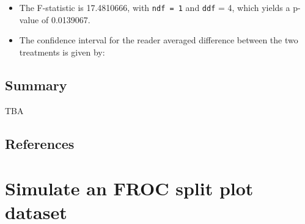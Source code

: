 \documentclass[]{book}
\newenvironment{Shaded}{\begin{snugshade}}{\end{snugshade}}
\newcommand{\CommentTok}[1]{\textcolor[rgb]{0.56,0.35,0.01}{\textit{#1}}}
\newcommand{\NormalTok}[1]{#1}
\newcommand{\OperatorTok}[1]{\textcolor[rgb]{0.81,0.36,0.00}{\textbf{#1}}}
\begin{document}
\begin{Shaded}
\end{Shaded}

\begin{itemize}
\item
  The F-statistic is 17.4810666, with \texttt{ndf\ =\ 1} and \texttt{ddf} = 4, which yields a p-value of 0.0139067.
\item
  The confidence interval for the reader averaged difference between the two treatments is given by:
\end{itemize}

\begin{Shaded}
\end{Shaded}

\hypertarget{summary-7}{%
\section{Summary}\label{summary-7}}

TBA

\hypertarget{references-13}{%
\section{References}\label{references-13}}

\hypertarget{SimufrocSpdataset}{%
\chapter{Simulate an FROC split plot dataset}\label{SimufrocSpdataset}}
\end{document}
